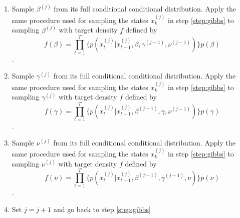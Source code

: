 \documentclass{article}
\begin{document}
\begin{enumerate}
\begin{enumerate}[label=\alph*.,leftmargin=1.75\parindent]
    \end{enumerate}
\item Sample $\beta^{(j)}$ from its full conditional conditional distribution. Apply the same procedure used for sampling the states $x^{(j)}_k$ in step \ref{step:gibbs} to sampling $\beta^{(j)}$ with target density $f$ defined by
    \[f(\beta) = \prod_{t=1}^T \{p(x^{(j)}_t|x^{(j)}_{t-1},\beta,\gamma^{(j-1)},\nu^{(j-1)})\}p(\beta)\].
\item Sample $\gamma^{(j)}$ from its full conditional conditional distribution. Apply the same procedure used for sampling the states $x^{(j)}_k$ in step \ref{step:gibbs} to sampling $\gamma^{(j)}$ with target density $f$ defined by
    \[f(\gamma) = \prod_{t=1}^T \{p(x^{(j)}_t|x^{(j)}_{t-1},\beta^{(j-1)},\gamma,\nu^{(j-1)})\}p(\gamma)\].
\item Sample $\nu^{(j)}$ from its full conditional conditional distribution. Apply the same procedure used for sampling the states $x^{(j)}_k$ in step \ref{step:gibbs} to sampling $\nu^{(j)}$ with target density $f$ defined by
    \[f(\nu) = \prod_{t=1}^T \{p(x^{(j)}_t|x^{(j)}_{t-1},\beta^{(j-1)},\gamma^{(j-1)},\nu)\}p(\nu)\].
\item Set $j = j + 1$ and go back to step \ref{step:gibbs}
\end{enumerate}
\end{document}
